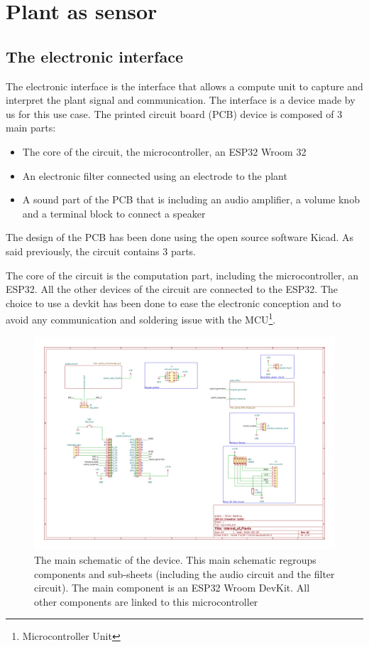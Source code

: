 \section{Plant as sensor}

\subsection{The electronic interface}

The electronic interface is the interface that allows a compute unit to capture and interpret the plant signal and
communication. The interface is a device made by us for this use case. The printed circuit board (PCB)
device is composed of 3 main parts:
\begin{itemize}
    \item The core of the circuit, the microcontroller, an ESP32 Wroom 32
    \item An electronic filter connected using an electrode to the plant
    \item A sound part of the PCB that is including an audio amplifier, a volume knob and a terminal block to connect a speaker
\end{itemize}

The design of the PCB has been done using the open source software Kicad.
As said previously, the circuit contains 3 parts.

The core of the circuit is the computation part, including the microcontroller, an ESP32. All the other
devices of the circuit are connected to the ESP32. The choice to use a devkit has been done 
to ease the electronic conception and to avoid any communication and soldering issue with the MCU\footnote[1]{Microcontroller Unit}.

\begin{figure}[h!]
    \centering
    \includegraphics[width=\textwidth]{images/iop.pdf}
    \caption{The main schematic of the device. This main schematic regroups components and sub-sheets (including the audio circuit
    and the filter circuit). The main component is an ESP32 Wroom DevKit. All other components are linked to this
    microcontroller} 
    \vspace{0.1cm}
    \label{fig:iop_schematic_main}
\end{figure}

